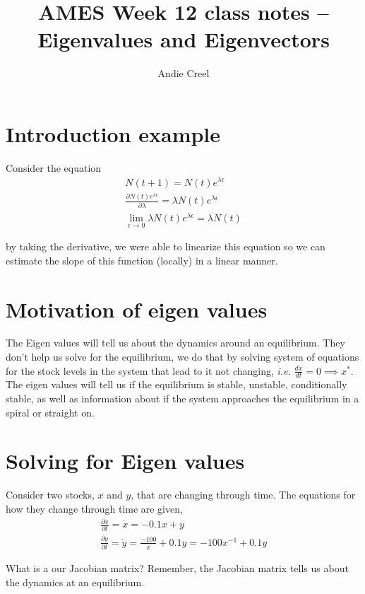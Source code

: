 \documentclass{article}
\title{AMES Week 12 class notes -- Eigenvalues and Eigenvectors }
\author{Andie Creel}
\begin{document}
\maketitle

\section{Introduction example }

Consider the equation 
\begin{align*}
    N(t+1) = N(t) e^{\lambda \epsilon} \\
    \frac{\partial N(t) e^{\lambda \epsilon}}{\partial \lambda} = \lambda  N(t) e^{\lambda \epsilon} \\
    \lim_{\epsilon \rightarrow 0 }  \lambda  N(t) e^{\lambda \epsilon} = \lambda  N(t) 
\end{align*}

by taking the derivative, we were able to linearize this equation so we can estimate the slope of this function (locally) in a linear manner. 

\section{Motivation of eigen values}
The Eigen values will tell us about the dynamics around an equilibrium. They don't help us solve for the equilibrium, we do that by solving system of equations for the stock levels in the system that lead to it not changing, \textit{i.e.} $\frac{d x}{d t} = 0 \implies x^*$. The eigen values will tell us if the equilibrium is stable, unstable, conditionally stable, as well as information about if the system approaches the equilibrium in a spiral or straight on. 

\section{Solving for Eigen values}
Consider two stocks, $x$ and $y$, that are changing through time. The equations for how they change through time are given, 
\begin{align}
    \frac{\partial x}{\partial t} = \dot x = -0.1x + y \\
    \frac{\partial y}{\partial t} = \dot y = \frac{-100}{x} + 0.1 y = -100 x^{-1} + 0.1 y
\end{align}

What is a our Jacobian matrix? Remember, the Jacobian matrix tells us about the dynamics at an equilibrium. 
\end{document}
